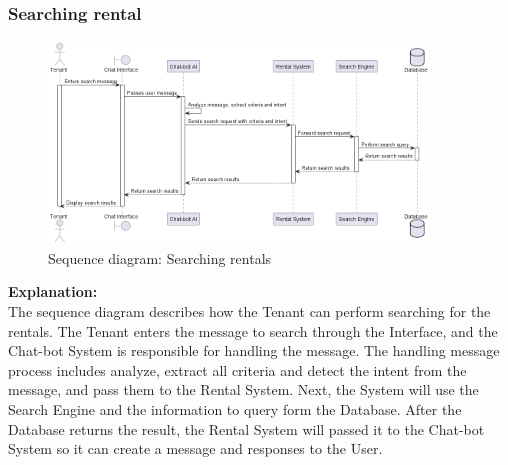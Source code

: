 \subsubsection{Searching rental}
\begin{figure}[H]
    \centering
    \includegraphics[width=0.9\textwidth]{Images/Sequence/seq_diag_search.png}
    \caption{Sequence diagram: Searching rentals}
    \label{fig:seq-diag-search}
\end{figure}
\noindent \textbf{Explanation:}\\
The sequence diagram describes how the Tenant can perform searching for the rentals. The Tenant enters the message to search through the Interface, and the Chat-bot System is responsible for handling the message. The handling message process includes analyze, extract all criteria and detect the intent from the message, and pass them to the Rental System. Next, the System will use the Search Engine and the information to query form the Database. After the Database returns the result, the Rental System will passed it to the Chat-bot System so it can create a message and responses to the User. 



\newpage

